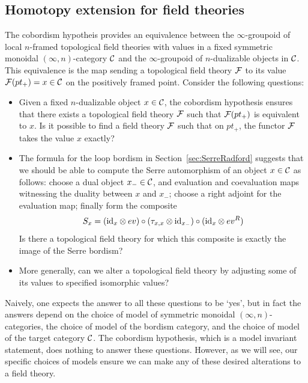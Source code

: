 \documentclass{amsart}
\begin{document}
\subsection{Homotopy extension for field theories} \label{sec:Hom_ext_field_thy}
The cobordism hypotheis provides an equivalence between the $\infty$-groupoid of local $n$-framed topological field theories with values in a fixed symmetric monoidal $(\infty,n)$-category $\mathcal C$ and the $\infty$-groupoid of $n$-dualizable objects in $\mathcal C$. This equivalence is the map sending a topological field theory $\mathcal F$ to its value $\mathcal F(pt_+) = x \in \mathcal C$ on the positively framed point. Consider the following questions:
\begin{itemize}
	\item Given a fixed $n$-dualizable object $x \in \mathcal C$, the cobordism hypothesis ensures that 
	there exists a topological field theory $\mathcal F$ such that $\mathcal F(pt_+)$ is equivalent to $x$. Is it possible to find a field theory $\mathcal F$ such that on $pt_+$, the functor $\mathcal F$ takes the value $x$ exactly? 
	\item The formula for the loop bordism in Section~\ref{sec:SerreRadford} suggests that we should be able to compute the Serre automorphism of an object $x \in \mathcal C$ as follows: choose a dual object $x_- \in \mathcal C$, and evaluation and coevaluation maps witnessing the duality between $x$ and $x_-$; choose a right adjoint for the evaluation map; finally form the composite
	\begin{equation*}
		S_x = (\mathrm{id}_{x} \otimes ev) \circ (\tau_{x, x} \otimes \mathrm{id}_{x_-}) \circ (\mathrm{id}_{x} \otimes ev^R)
	\end{equation*}
Is there a topological field theory for which this composite is exactly the image of the Serre bordism? 
	\item More generally, can we alter a topological field theory by adjusting some of its values to specified isomorphic values?
\end{itemize}
\nid Naively, one expects the answer to all these questions to be `yes', but in fact the answers depend on the choice of model of symmetric monoidal $(\infty,n)$-categories, the choice of model of the bordism category, and the choice of model of the target category $\mathcal C$.  The cobordism hypothesis, which is a model invariant statement, does nothing to answer these questions.  However, as we will see, our specific choices of models ensure we can make any of these desired alterations to a field theory.
\end{document}
